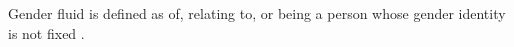 Gender fluid is defined as of, relating to, or being a person whose gender 
identity is not fixed \cite{gender-fluid-def}.

